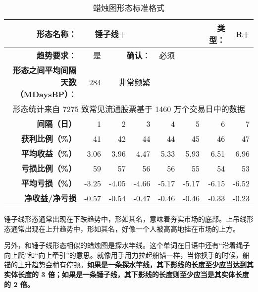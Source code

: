 \begin{table}[!ht]
    \centering
    \caption{蜡烛图形态标准格式}
    \begin{tabular}{|r|r|r|r|r|r|r|r|}
        \hline
        \textbf{形态名称}：                & \multicolumn{2}{r}{锤子线+} & ~                                 & ~     & ~     & \textbf{类型}： & R+            \\ \hline
        \textbf{趋势要求}：                & 是                        & \multicolumn{2}{r|}{\textbf{确认}：} & 必须    & ~     & ~            & ~             \\ \hline
        \textbf{形态之间平均间隔天数（MDaysBP）}： & 284                      & \multicolumn{2}{r|}{非常频繁}         & ~     & ~     & ~            & ~             \\ \hline
        \multicolumn{8}{|c|}{形态统计来自 7275 致常见流通股票基于 1460 万个交易日中的数据}                                                                                  \\ \hline
        \textbf{间隔（日）}                & 1                        & 2                                 & 3     & 4     & 5            & 6     & 7     \\ \hline
        \textbf{获利比例（\%）}             & 41                       & 42                                & 44    & 44    & 45           & 46    & 47    \\ \hline
        \textbf{平均收益（\%）}             & 3.06                     & 3.96                              & 4.47  & 5.33  & 5.93         & 6.51  & 6.96  \\ \hline
        \textbf{亏损比例（\%）}             & 59                       & 57                                & 56    & 56    & 55           & 54    & 53    \\ \hline
        \textbf{平均亏损（\%）}             & -3.25                    & -4.05                             & -4.66 & -5.17 & -5.17        & -6.15 & -6.52 \\ \hline
        \textbf{净收益/净亏损 }             & -0.57                    & -0.54                             & -0.47 & -0.46 & -0.46        & -0.33 & -0.23 \\ \hline
    \end{tabular}
\end{table}
锤子线形态通常出现在下跌趋势中，形如其名，意味着夯实市场的底部。上吊线形态通常出现在上升趋势中，形如其名，好像一个人被高高地挂在市场的上方。

另外，和锤子线形态相似的蜡烛图是探水竿线。这个单词在日语中还有“沿着绳子向上爬”和“向上牵引”的意思。就像用手用力拉起船锚一样，当你换手的时候，船锚的上升趋势会稍有停顿。\textbf{如果是一条探水竿线，其下影线的长度至少应当达到其实体长度的 3 倍；如果是一条锤子线，其下影线的长度则至少应当是其实体长度的 2 倍。}
